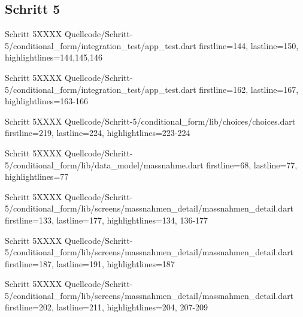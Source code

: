 \clearpage 


\subsection{Schritt 5}

\begin{alexlisting}{Schritt 5}{XXXX}
    {Quellcode/Schritt-5/conditional_form/integration_test/app_test.dart}
    {firstline=144, lastline=150, highlightlines={144,145,146}}
    \label{lst:Schritt5XXXX}
  \end{alexlisting}

  
\begin{alexlisting}{Schritt 5}{XXXX}
    {Quellcode/Schritt-5/conditional_form/integration_test/app_test.dart}
    {firstline=162, lastline=167, highlightlines={163-166}}
    \label{lst:Schritt5XXXX}
  \end{alexlisting}

  \begin{alexlisting}{Schritt 5}{XXXX}
    {Quellcode/Schritt-5/conditional_form/lib/choices/choices.dart}
    {firstline=219, lastline=224, highlightlines={223-224}}
    \label{lst:Schritt5XXXX}
  \end{alexlisting}

  \begin{alexlisting}{Schritt 5}{XXXX}
    {Quellcode/Schritt-5/conditional_form/lib/data_model/massnahme.dart}
    {firstline=68, lastline=77, highlightlines={77}}
    \label{lst:Schritt5XXXX}
  \end{alexlisting}

  \begin{alexlisting}{Schritt 5}{XXXX}
    {Quellcode/Schritt-5/conditional_form/lib/screens/massnahmen_detail/massnahmen_detail.dart}
    {firstline=133, lastline=177, highlightlines={134, 136-177}}
    \label{lst:Schritt5XXXXX}
  \end{alexlisting}

  \begin{alexlisting}{Schritt 5}{XXXX}
    {Quellcode/Schritt-5/conditional_form/lib/screens/massnahmen_detail/massnahmen_detail.dart}
    {firstline=187, lastline=191, highlightlines={187}}
    \label{lst:Schritt5XXXXX}
  \end{alexlisting}

  \begin{alexlisting}{Schritt 5}{XXXX}
    {Quellcode/Schritt-5/conditional_form/lib/screens/massnahmen_detail/massnahmen_detail.dart}
    {firstline=202, lastline=211, highlightlines={204, 207-209}}
    \label{lst:Schritt5XXXXX}
  \end{alexlisting}

